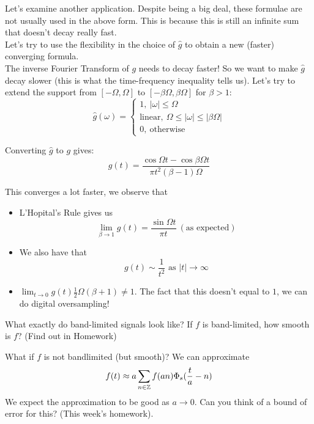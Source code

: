 \documentclass{article}
\begin{document}
Let's examine another application. Despite being a big deal, these formulae are not usually used in the above form. This is because this is still an infinite sum that doesn't decay really fast.\\

Let's try to use the flexibility in the choice of $\widehat{g}$ to obtain a new (faster) converging formula.\\

The inverse Fourier Transform of $g$ needs to decay faster! So we want to make $\widehat{g}$ decay slower (this is what the time-frequency inequality tells us). Let's try to extend the support from $[-\Omega, \Omega]$ to $[-\beta \Omega, \beta \Omega]$ for $\beta > 1$:
\[\widehat{g}(\omega) = \begin{cases}
    1,\ |\omega| \leq \Omega\\
    \text{linear},\ \Omega \leq |\omega| \leq |\beta \Omega|\\
    0,\ \text{otherwise}
\end{cases}\]

Converting $\widehat{g}$ to $g$ gives:
\[g(t) = \frac{\cos \Omega t - \cos \beta \Omega t}{\pi t^2 (\beta - 1) \Omega}\]

This converges a lot faster, we observe that
\begin{itemize}
    \item L'Hopital's Rule gives us 
 \[\lim_{\beta \to 1} g(t) = \frac{\sin \Omega t}{\pi t}\ (\text{as expected})\]   
    \item We also have that
\[g(t) \sim \frac{1}{t^2} \text{ as } |t| \to \infty \]
\item $\lim_{t \to 0} g(t) \frac{1}{2} \Omega (\beta + 1) \neq 1$. The fact that this doesn't equal to $1$, we can do digital oversampling!
\end{itemize}

\begin{question}
    What exactly do band-limited signals look like? If $f$ is band-limited, how smooth is $f$? (Find out in Homework)
\end{question}

\begin{question}
    What if $f$ is not bandlimited (but smooth)? We can approximate
    \[f(t) \approx a \sum_{n \in \mathbb{Z}} f(an) \Phi_s(\frac{t}{a} - n)\]
    We expect the approximation to be good as $a \to 0$. Can you think of a bound of error for this? (This week's homework).
\end{question}
\end{document}

